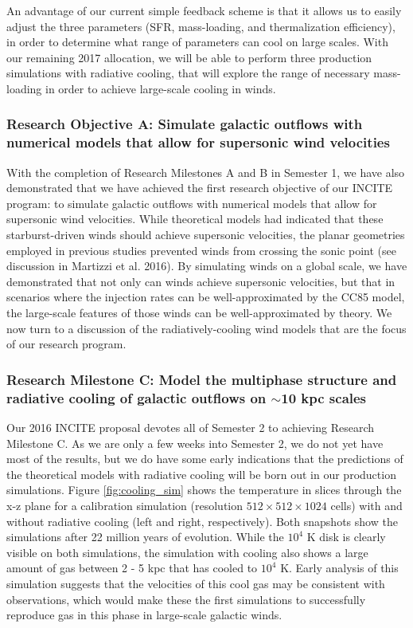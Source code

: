 \documentclass[11pt,letterpaper,english]{article}
\begin{document}
An advantage of our current simple feedback scheme is that it allows us to easily adjust the three parameters (SFR, mass-loading, and thermalization efficiency), in order to determine what range of parameters can cool on large scales. With our remaining 2017 allocation, we will be able to perform three production simulations with radiative cooling, that will explore the range of necessary mass-loading in order to achieve large-scale cooling in winds.

\subsubsection{Research Objective A: Simulate galactic outflows with numerical models that allow for supersonic wind velocities}

With the completion of Research Milestones A and B in Semester 1, we have also demonstrated that we have achieved the first research objective of our INCITE program: to simulate galactic outflows with numerical models that allow for supersonic wind velocities. While theoretical models had indicated that these starburst-driven winds should achieve supersonic velocities, the planar geometries employed in previous studies prevented winds from crossing the sonic point (see discussion in Martizzi et al. 2016). By simulating winds on a global scale, we have demonstrated that not only can winds achieve supersonic velocities, but that in scenarios where the injection rates can be well-approximated by the CC85 model, the large-scale features of those winds can be well-approximated by theory. We now turn to a discussion of the radiatively-cooling wind models that are the focus of our research program.

\subsubsection{Research Milestone C: Model the multiphase structure and radiative cooling of galactic outflows on $\sim$10 kpc scales}

Our 2016 INCITE proposal devotes all of Semester 2 to achieving Research Milestone C. As we are only a few weeks into Semester 2, we do not yet have most of the results, but we do have some early indications that the predictions of the theoretical models with radiative cooling will be born out in our production simulations. Figure \ref{fig:cooling_sim} shows the temperature in slices through the x-z plane for a calibration simulation (resolution $512\times512\times1024$ cells) with and without radiative cooling (left and right, respectively). Both snapshots show the simulations after 22 million years of evolution. While the $10^4$ K disk is clearly visible on both simulations, the simulation with cooling also shows a large amount of gas between 2 - 5 kpc that has cooled to $10^4$ K. Early analysis of this simulation suggests that the velocities of this cool gas may be consistent with observations, which would make these the first simulations to successfully reproduce gas in this phase in large-scale galactic winds.
\end{document}
